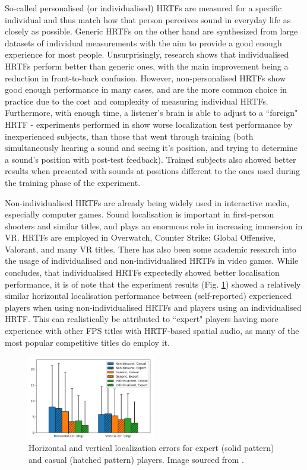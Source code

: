 So-called personalised (or individualised) HRTFs are measured for a specific individual and thus
match how that person perceives sound in everyday life as closely as possible.
Generic HRTFs on the other hand are synthesized from large datasets of individual measurements 
with the aim to provide a good enough experience for most people.
Unsurprisingly, research shows that individualised HRTFs perform better than generic ones, with the main improvement being a reduction in front-to-back confusion.
\cite{localisation_nonindividualized_hrtfs}
However, non-personalised HRTFs show good enough performance in many cases, and are the more common choice in practice due to the 
cost and complexity of measuring individual HRTFs. 
Furthermore, with enough time, a listener's brain is able to adjust to a ``foreign" HRTF - experiments performed in 
\cite{adaptation_to_nonindividualised_hrtfs} show worse localization test performance by inexperienced subjects, 
than those that went through training (both simultaneously hearing a sound and seeing it's position, and trying to determine a sound's position with post-test feedback).
Trained subjects also showed better results when presented with sounds at positions different to the ones used during the training phase of the experiment.

Non-individualised HRTFs are already being widely used in interactive media, especially computer games. 
Sound localisation is important in first-person shooters and similar titles, and plays an enormous role in increasing immersion in VR. 
HRTFs are employed in Overwatch, Counter Strike: Global Offensive, Valorant, and many VR titles. 
There has also been some academic research into the usage of individualised and non-individualised HRTFs in video games.
While \cite{hrtfs_3d_shooter_game} concludes, that individualised HRTFs expectedly showed better localisation performance,
it is of note that the experiment results (Fig. \ref{fig:hrtf_3d_shooter_test_results}) showed a relatively similar horizontal localisation performance between 
(self-reported) experienced players when using non-individualised HRTFs and players using an individualised HRTF. 
This can realistically be attributed to ``expert" players having more experience with other FPS titles with HRTF-based spatial audio, 
as many of the most popular competitive titles do employ it.

\begin{figure}
    \centering
    \includegraphics[width=0.5\textwidth]{images/spatial_audio/hrtf_fps_test_results.png}       
    \caption{Horizontal and vertical localization errors for expert (solid pattern) 
        and casual (hatched pattern) players. Image sourced from \cite{hrtfs_3d_shooter_game}.
        \label{fig:hrtf_3d_shooter_test_results}}
\end{figure}

